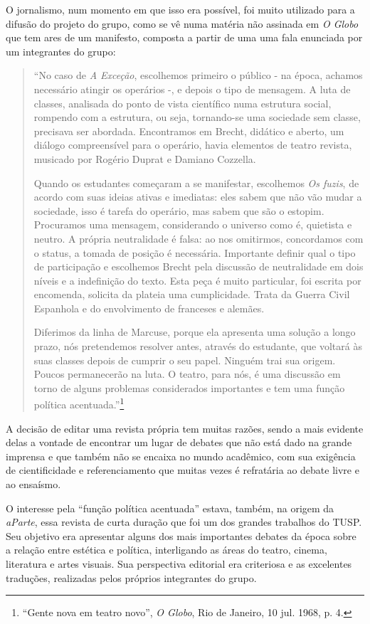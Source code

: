 O jornalismo, num momento em que isso era possível, foi muito utilizado
para a difusão do projeto do grupo, como se vê numa matéria não assinada
em \textit{O Globo} que tem ares de um manifesto, composta a partir de uma
uma fala enunciada por um integrantes do grupo:

\begin{quote}
“No caso de \textit{A Exceção}, escolhemos primeiro o público - na época,
achamos necessário atingir os operários -, e depois o tipo de mensagem.
A luta de classes, analisada do ponto de vista científico numa estrutura
social, rompendo com a estrutura, ou seja, tornando-se uma sociedade sem
classe, precisava ser abordada. Encontramos em Brecht, didático e
aberto, um diálogo compreensível para o operário, havia elementos de
teatro revista, musicado por Rogério Duprat e Damiano Cozzella.

Quando os estudantes começaram a se manifestar, escolhemos \textit{Os
fuzis}, de acordo com suas ideias ativas e imediatas: eles sabem que não
vão mudar a sociedade, isso é tarefa do operário, mas sabem que são o
estopim. Procuramos uma mensagem, considerando o universo como é,
quietista e neutro. A própria neutralidade é falsa: ao nos omitirmos,
concordamos com o status, a tomada de posição é necessária. Importante
definir qual o tipo de participação e escolhemos Brecht pela discussão
de neutralidade em dois níveis e a indefinição do texto. Esta peça é
muito particular, foi escrita por encomenda, solicita da plateia uma
cumplicidade. Trata da Guerra Civil Espanhola e do envolvimento de
franceses e alemães.

Diferimos da linha de Marcuse, porque ela apresenta uma solução a longo
prazo, nós pretendemos resolver antes, através do estudante, que voltará
às suas classes depois de cumprir o seu papel. Ninguém trai sua origem.
Poucos permanecerão na luta. O teatro, para nós, é uma discussão em
torno de alguns problemas considerados importantes e tem uma função
política acentuada.”\footnote{“Gente nova em teatro novo”, \textit{O
  Globo}, Rio de Janeiro, 10 jul. 1968, p. 4.}
\end{quote}

A decisão de editar uma revista própria tem muitas razões, sendo a mais
evidente delas a vontade de encontrar um lugar de debates que não está
dado na grande imprensa e que também não se encaixa no mundo acadêmico,
com sua exigência de cientificidade e referenciamento que muitas vezes é
refratária ao debate livre e ao ensaísmo.

O interesse pela “função política acentuada” estava, também, na origem
da \textit{aParte}, essa revista de curta duração que foi um dos grandes
trabalhos do TUSP. Seu objetivo era apresentar alguns dos mais
importantes debates da época sobre a relação entre estética e política,
interligando as áreas do teatro, cinema, literatura e artes visuais. Sua
perspectiva editorial era criteriosa e as excelentes traduções,
realizadas pelos próprios integrantes do grupo.

